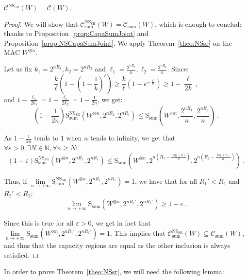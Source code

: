 \begin{corollary}
  \label{cor:NSsr}
  $\mathcal{C}^{\mathrm{NS}_{\mathrm{SR}}}(W)=\mathcal{C}(W)$.
\end{corollary}
\begin{proof}
  We will show that $\mathcal{C}_{\text{sum}}^{\mathrm{NS}_{\mathrm{SR}}}(W)=\mathcal{C}_{\text{sum}}(W)$, which is enough to conclude thanks to Proposition~\ref{prop:CapaSumJoint} and Proposition~\ref{prop:NSCapaSumJoint}. We apply Theorem~\ref{theo:NSsr} on the MAC $W^{\otimes n}$.

  Let us fix $k_1=2^{nR_1},k_2=2^{nR_2}$ and $\ell_1=\frac{2^{nR_1}}{n},\ell_2=\frac{2^{nR_2}}{n}$. Since:
  \[ \frac{k}{\ell}\left(1-\left(1-\frac{1}{k}\right)^{\ell}\right) \geq \frac{k}{\ell}\left(1-e^{-\frac{\ell}{k}}\right) \geq 1 - \frac{\ell}{2k} \ ,\]
  and $1 - \frac{\ell_1}{2k_1} = 1 - \frac{\ell_2}{2k_2} = 1 - \frac{1}{2n}$, we get:
\[ \left(1-\frac{1}{2n}\right)\mathrm{S}_{\text{sum}}^{\mathrm{NS}_{\mathrm{SR}}}(W^{\otimes n},2^{nR_1},2^{nR_1}) \leq \mathrm{S}_{\text{sum}}\left(W^{\otimes n},\frac{2^{nR_1}}{n},\frac{2^{nR_2}}{n}\right)\ . \]

  As $1-\frac{1}{2n}$ tends to $1$ when $n$ tends to infinity, we get that $\forall \varepsilon > 0, \exists N \in \mathbb{N}, \forall n\geq N$:
  \[(1-\varepsilon)\mathrm{S}_{\text{sum}}^{\mathrm{NS}_{\mathrm{SR}}}(W^{\otimes n},2^{nR_1},2^{nR_1}) \leq \mathrm{S}_{\text{sum}}(W^{\otimes n},2^{n(R_1-\frac{\log(n)}{n})},2^{n(R_2-\frac{\log(n)}{n})}) \ . \]

Thus, if $\underset{n \rightarrow +\infty}{\lim} \mathrm{S}_{\text{sum}}^{\mathrm{NS}_{\mathrm{SR}}}(W^{\otimes n},2^{nR_1},2^{nR_1})  = 1$, we have that for all $R_1'<R_1$ and $R_2'<R_2$:
\[ \underset{n \rightarrow +\infty}{\lim} \mathrm{S}_{\text{sum}}(W^{\otimes n},2^{nR_1'},2^{nR_1'}) \geq 1-\varepsilon \ . \]

Since this is true for all $\varepsilon > 0$, we get in fact that $\underset{n \rightarrow +\infty}{\lim} \mathrm{S}_{\text{sum}}(W^{\otimes n},2^{nR_1'},2^{nR_1'}) = 1$. This implies that $\mathcal{C}_{\text{sum}}^{\mathrm{NS}_{\mathrm{SR}}}(W) \subseteq \mathcal{C}_{\text{sum}}(W)$, and thus that the capacity regions are equal as the other inclusion is always satisfied.
\end{proof}

In order to prove Theorem~\ref{theo:NSsr}, we will need the following lemma:


